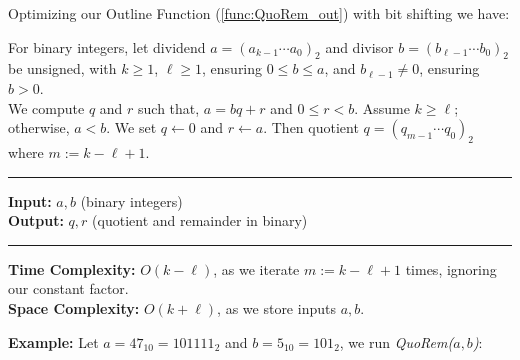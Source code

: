 \newpage

\noindent
Optimizing our Outline Function (\ref{func:QuoRem_out}) with bit shifting we have:

\begin{Func}

    \label{func:QuoRem}

    For binary integers, let dividend $a = (a_{k-1} \cdots a_0)_2$ and divisor $b = (b_{\ell-1} \cdots b_0)_2$ be unsigned, with $k \geq 1$,
    $\ell \geq 1$, ensuring $0 \leq b \leq a$, and $b_{\ell-1} \neq 0$, ensuring $b > 0$.\\ 
    
    \noindent
    We compute $q$ and $r$ such that, $a = bq + r$ and $0 \leq r < b$. 
    Assume $k \geq \ell$; otherwise, $a < b$. We set $q \gets 0$ and $r \gets a$. 
    Then quotient $q = (q_{m-1} \cdots q_0)_2$ where $m := k - \ell + 1$.

    \noindent\rule{\textwidth}{0.4pt}

    \vspace{.5em}
    \noindent
    \textbf{Input:} $a, b$ (binary integers)\\
    \noindent
    \textbf{Output:} $q, r$ (quotient and remainder in binary)\\
    \begin{algorithm}[H]
        \SetAlgoLined
    \end{algorithm}
    \noindent\rule{\textwidth}{0.4pt}
    \noindent

    \noindent
    \textbf{Time Complexity:} $O(k-\ell)$, as we iterate $m := k - \ell + 1$ times, ignoring our constant factor.\\
    \textbf{Space Complexity:} $O(k + \ell)$, as we store inputs $a, b$.
\end{Func}

\noindent
\textbf{Example:} Let $a = 47_10 = 101111_2$ and $b = 5_10 = 101_2$, we run \textit{QuoRem($a,b$)}:

